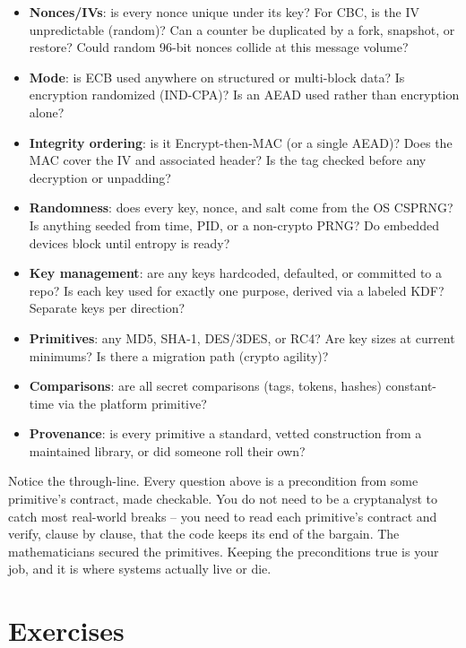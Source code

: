 \begin{itemize}
\item \textbf{Nonces/IVs}: is every nonce unique under its key? For CBC, is the IV unpredictable (random)? Can a counter be duplicated by a fork, snapshot, or restore? Could random 96-bit nonces collide at this message volume?
\item \textbf{Mode}: is ECB used anywhere on structured or multi-block data? Is encryption randomized (IND-CPA)? Is an AEAD used rather than encryption alone?
\item \textbf{Integrity ordering}: is it Encrypt-then-MAC (or a single AEAD)? Does the MAC cover the IV and associated header? Is the tag checked before any decryption or unpadding?
\item \textbf{Randomness}: does every key, nonce, and salt come from the OS CSPRNG? Is anything seeded from time, PID, or a non-crypto PRNG? Do embedded devices block until entropy is ready?
\item \textbf{Key management}: are any keys hardcoded, defaulted, or committed to a repo? Is each key used for exactly one purpose, derived via a labeled KDF? Separate keys per direction?
\item \textbf{Primitives}: any MD5, SHA-1, DES/3DES, or RC4? Are key sizes at current minimums? Is there a migration path (crypto agility)?
\item \textbf{Comparisons}: are all secret comparisons (tags, tokens, hashes) constant-time via the platform primitive?
\item \textbf{Provenance}: is every primitive a standard, vetted construction from a maintained library, or did someone roll their own?
\end{itemize}

\begin{recoverybox}
Notice the through-line. Every question above is a precondition from some primitive's contract, made checkable. You do not need to be a cryptanalyst to catch most real-world breaks -- you need to read each primitive's contract and verify, clause by clause, that the code keeps its end of the bargain. The mathematicians secured the primitives. Keeping the preconditions true is your job, and it is where systems actually live or die.
\end{recoverybox}

\section*{Exercises}

